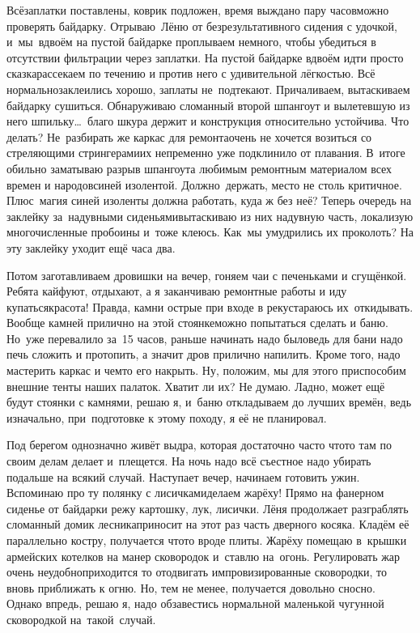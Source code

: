 Всё\mdash заплатки поставлены, коврик подложен, время выждано пару часов\mdash можно проверять байдарку. Отрываю~Лёню от безрезультативного сидения с удочкой, и~мы~вдвоём на пустой байдарке проплываем немного, чтобы убедиться в отсутствии фильтрации через заплатки. На пустой байдарке вдвоём идти просто сказка\mdash рассекаем по течению и против него с удивительной лёгкостью. Всё нормально\mdash заклеились хорошо, заплаты не~подтекают. Причаливаем, вытаскиваем байдарку сушиться. Обнаруживаю сломанный второй шпангоут и вылетевшую из него шпильку\ldots~благо шкура держит и конструкция относительно устойчива. Что делать? Не~разбирать же каркас для ремонта\mdash очень не хочется возиться со стреляющими стрингерами\mdash их непременно уже подклинило от плавания. В~итоге обильно заматываю разрыв шпангоута любимым ремонтным материалом всех времен и народов\mdash синей изолентой. Должно~держать, место не столь критичное. Плюс~магия синей изоленты должна работать, куда ж без неё? Теперь очередь на заклейку за~надувными сиденьями\mdash вытаскиваю из них надувную часть, локализую многочисленные пробоины и~тоже клеюсь. Как~мы умудрились их проколоть? На эту заклейку уходит ещё часа два. 

Потом заготавливаем дровишки на вечер, гоняем чаи с печеньками и сгущёнкой. Ребята кайфуют, отдыхают, а я заканчиваю ремонтные работы и иду купаться\mdash красота! Правда, камни острые при входе в реку\mdash стараюсь их~откидывать. Вообще камней прилично на этой стоянке\mdash можно попытаться сделать и баню. Но~уже перевалило за~15 часов, раньше начинать надо было\mdash ведь для бани надо печь сложить и протопить, а значит дров прилично напилить. Кроме того, надо мастерить каркас и чем\sdash то его накрыть. Ну, положим, мы для этого приспособим внешние тенты наших палаток. Хватит ли их? Не думаю. Ладно, может ещё будут стоянки с камнями, решаю я, и~баню откладываем до лучших времён, ведь изначально, при~подготовке к этому походу, я её не планировал.  

Под берегом однозначно живёт выдра, которая достаточно часто что\sdash то там по своим делам делает и~плещется. На ночь надо всё съестное надо убирать подальше на всякий случай. Наступает вечер, начинаем готовить ужин. Вспоминаю про ту полянку с лисичками\mdash делаем жарёху! Прямо на фанерном сиденье от байдарки режу картошку, лук, лисички. Лёня продолжает разграблять сломанный домик лесника\mdash приносит на этот раз часть дверного косяка. Кладём её параллельно костру, получается что\sdash то вроде плиты. Жарёху помещаю в~крышки армейских котелков на манер сковородок и~ставлю на~огонь. Регулировать жар очень неудобно\mdash приходится то отодвигать импровизированные сковородки, то вновь приближать к огню. Но, тем не менее, получается довольно сносно. Однако впредь, решаю я, надо обзавестись нормальной маленькой чугунной сковородкой на~такой~случай. 

